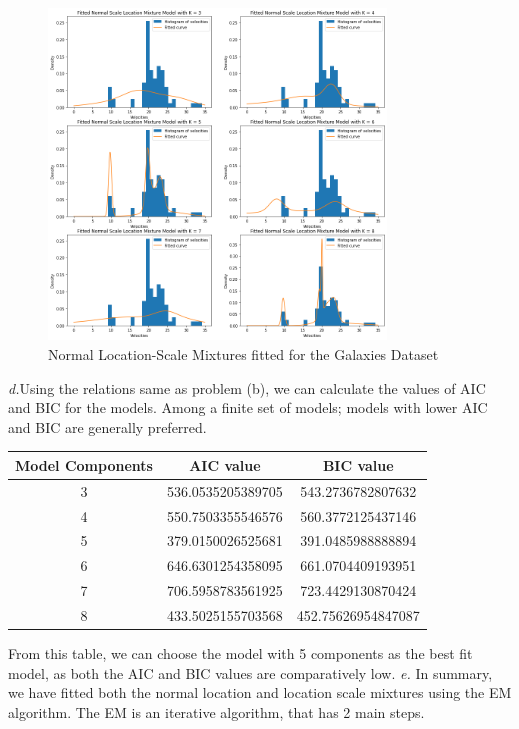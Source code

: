 \documentclass[11pt]{article}
\begin{document}
\begin{figure}[H]
  \centering
  \includegraphics[width = 0.8\textwidth]{output2.png}
  \caption{Normal Location-Scale Mixtures fitted for the Galaxies Dataset}
\end{figure}
\emph{d.}Using the relations same as problem (b), we can calculate the values of AIC and BIC for the models. Among a finite set of models; models with lower AIC and BIC are generally preferred.
\begin{center}
\begin{tabular}{ |c|c|c| }
  \hline
 \textbf{Model Components} & \textbf{AIC value} & \textbf{BIC value}\\
 \hline
 3 & 536.0535205389705 & 543.2736782807632 \\
 \hline
 4 & 550.7503355546576 & 560.3772125437146 \\
 \hline
 5 & 379.0150026525681 & 391.0485988888894 \\
 \hline
 6 & 646.6301254358095& 661.0704409193951 \\
 \hline
 7 & 706.5958783561925 & 723.4429130870424 \\
 \hline
 8 & 433.5025155703568 & 452.75626954847087 \\
 \hline
\end{tabular}
\end{center}
From this table, we can choose the model with 5 components as the best fit model, as both the AIC and BIC values are comparatively low.
\emph{e.} In summary, we have fitted both the normal location and location scale mixtures using the EM algorithm. The EM is an iterative algorithm, that has 2 main steps.
\end{document}
